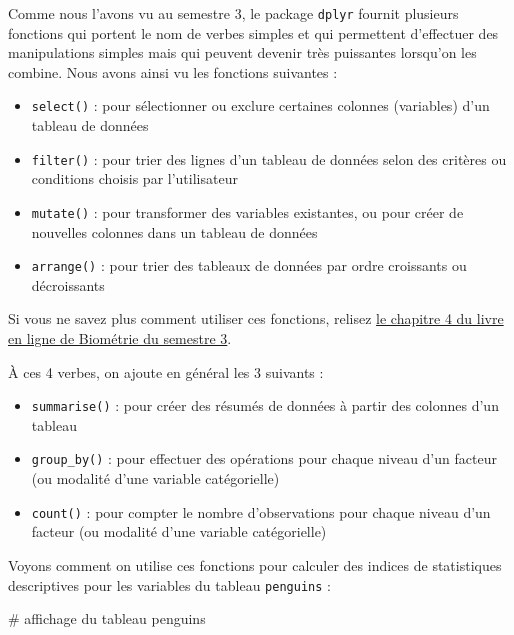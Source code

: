 \documentclass[
  a4paper,
  DIV=11,
  numbers=noendperiod,
  oneside]{scrreprt}
\newenvironment{Shaded}{}{}
\newcommand{\CommentTok}[1]{\textcolor[rgb]{0.42,0.45,0.49}{#1}}
\newcommand{\NormalTok}[1]{\textcolor[rgb]{0.14,0.16,0.18}{#1}}
\providecommand{\tightlist}{%
  \setlength{\itemsep}{0pt}\setlength{\parskip}{0pt}}\usepackage{longtable,booktabs,array}
\begin{document}
Comme nous l'avons vu au semestre 3, le package \texttt{dplyr} fournit
plusieurs fonctions qui portent le nom de verbes simples et qui
permettent d'effectuer des manipulations simples mais qui peuvent
devenir très puissantes lorsqu'on les combine. Nous avons ainsi vu les
fonctions suivantes :

\begin{itemize}
\tightlist
\item
  \texttt{select()} : pour sélectionner ou exclure certaines colonnes
  (variables) d'un tableau de données
\item
  \texttt{filter()} : pour trier des lignes d'un tableau de données
  selon des critères ou conditions choisis par l'utilisateur
\item
  \texttt{mutate()} : pour transformer des variables existantes, ou pour
  créer de nouvelles colonnes dans un tableau de données
\item
  \texttt{arrange()} : pour trier des tableaux de données par ordre
  croissants ou décroissants
\end{itemize}

Si vous ne savez plus comment utiliser ces fonctions, relisez
\href{https://besibo.github.io/BiometrieS3/04-DataWrangling.html}{le
chapitre 4 du livre en ligne de Biométrie du semestre 3}.

À ces 4 verbes, on ajoute en général les 3 suivants :

\begin{itemize}
\tightlist
\item
  \texttt{summarise()} : pour créer des résumés de données à partir des
  colonnes d'un tableau
\item
  \texttt{group\_by()} : pour effectuer des opérations pour chaque
  niveau d'un facteur (ou modalité d'une variable catégorielle)
\item
  \texttt{count()} : pour compter le nombre d'observations pour chaque
  niveau d'un facteur (ou modalité d'une variable catégorielle)
\end{itemize}

Voyons comment on utilise ces fonctions pour calculer des indices de
statistiques descriptives pour les variables du tableau
\texttt{penguins} :

\begin{Shaded}
\begin{Highlighting}[]
\CommentTok{\# affichage du tableau}
\NormalTok{penguins}
\end{Highlighting}
\end{Shaded}
\end{document}
